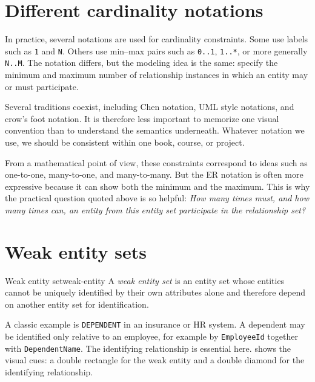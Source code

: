 \documentclass[11pt,a4paper,openany]{book}
\begin{document}
\section{Different cardinality notations}
In practice, several notations are used for cardinality constraints. Some use labels such as \texttt{1} and \texttt{N}. Others use min--max pairs such as \texttt{0..1}, \texttt{1..*}, or more generally \texttt{N..M}. The notation differs, but the modeling idea is the same: specify the minimum and maximum number of relationship instances in which an entity may or must participate.

Several traditions coexist, including Chen notation, UML style notations, and crow's foot notation. It is therefore less important to memorize one visual convention than to understand the semantics underneath. Whatever notation we use, we should be consistent within one book, course, or project.

From a mathematical point of view, these constraints correspond to ideas such as one-to-one, many-to-one, and many-to-many. But the ER notation is often more expressive because it can show both the minimum and the maximum. This is why the practical question quoted above is so helpful: \emph{How many times must, and how many times can, an entity from this entity set participate in the relationship set?}

\section{Weak entity sets}
\begin{definition}{Weak entity set}{weak-entity}
A \emph{weak entity set} is an entity set whose entities cannot be uniquely identified by their own attributes alone and therefore depend on another entity set for identification.
\end{definition}

A classic example is \texttt{DEPENDENT} in an insurance or HR system. A dependent may be identified only relative to an employee, for example by \texttt{EmployeeId} together with \texttt{DependentName}. The identifying relationship is essential here.  shows the visual cues: a double rectangle for the weak entity and a double diamond for the identifying relationship.
\end{document}
